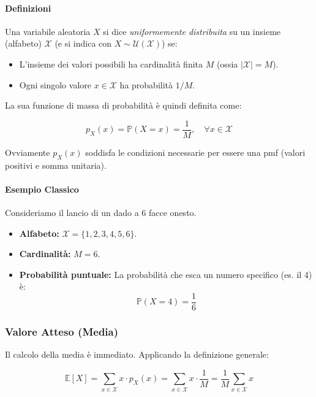 \paragraph{Definizioni}
Una variabile aleatoria $X$ si dice \textit{uniformemente distribuita} su un insieme (alfabeto) $\mathcal{X}$ (e si indica con $X \sim \mathcal{U}(\mathcal{X})$) se:
\begin{itemize}
    \item L'insieme dei valori possibili ha cardinalità finita $M$ (ossia $|\mathcal{X}| = M$).
    \item Ogni singolo valore $x \in \mathcal{X}$ ha probabilità $1/M$.
\end{itemize}

La sua funzione di massa di probabilità è quindi definita come:

\begin{equation}
\boxed{p_X(x) = \mathbb{P}(X=x) = \frac{1}{M}, \quad \forall x \in \mathcal{X}}
\end{equation}

Ovviamente $p_X(x)$ soddisfa le condizioni necessarie per essere una pmf (valori positivi e somma unitaria).

\paragraph{Esempio Classico}
Consideriamo il lancio di un dado a 6 facce onesto.
\begin{itemize}
    \item \textbf{Alfabeto:} $\mathcal{X} = \{1, 2, 3, 4, 5, 6\}$.
    \item \textbf{Cardinalità:} $M = 6$.
    \item \textbf{Probabilità puntuale:} La probabilità che esca un numero specifico (es. il 4) è:
    \[ \mathbb{P}(X=4) = \frac{1}{6} \]
\end{itemize}

\subsubsection{Valore Atteso (Media)}

Il calcolo della media è immediato. Applicando la definizione generale:

\begin{equation}
\mathbb{E}[X] = \sum_{x \in \mathcal{X}} x \cdot p_X(x) = \sum_{x \in \mathcal{X}} x \cdot \frac{1}{M} = \frac{1}{M} \sum_{x \in \mathcal{X}} x
\end{equation}

